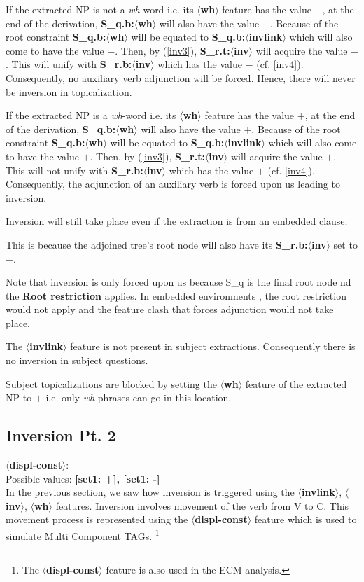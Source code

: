 If the extracted NP is not a {\em wh}-word i.e. its {\bf $\langle$wh$\rangle$}
feature has the value $-$, at the end of the derivation, 
{\bf S_{q}.b:$\langle$wh$\rangle$} will also have the value $-$. Because of
the root constraint {\bf S_{q}.b:$\langle$wh$\rangle$} will be equated 
to {\bf S_{q}.b:$\langle$invlink$\rangle$} which will also come to have 
the value $-$. Then, by (\ref{inv3}), {\bf S_{r}.t:$\langle$inv$\rangle$} 
will acquire the value $-$. This will unify with {\bf S_{r}.b:$\langle$inv$\rangle$}
which has the value $-$ (cf. \ref{inv4}). Consequently, no auxiliary verb
adjunction will be forced. Hence, there will never be inversion in topicalization.

If the extracted NP is a {\em wh}-word i.e. its {\bf $\langle$wh$\rangle$} 
feature has the value $+$, at the end of the derivation, 
{\bf S_{q}.b:$\langle$wh$\rangle$} will also have the value $+$. Because of
the root constraint {\bf S_{q}.b:$\langle$wh$\rangle$} will be equated 
to {\bf S_{q}.b:$\langle$invlink$\rangle$} which will also come to have
the value $+$. Then, by (\ref{inv3}), {\bf S_{r}.t:$\langle$inv$\rangle$} 
will acquire the value $+$. This will not unify with {\bf S_{r}.b:$\langle$inv$\rangle$}
which has the value $+$ (cf. \ref{inv4}). Consequently, the adjunction
of an auxiliary verb is forced upon us leading to inversion.

Inversion will still take place even if the extraction is from an embedded
clause.


This is because the adjoined tree's root node will also have its 
{\bf S_{r}.b:$\langle$inv$\rangle$} set to $-$. 


Note that inversion is only forced upon us because S_{q} is the final root node
nd the {\bf Root restriction} applies. In embedded environments , the 
root restriction would not apply and the feature clash that forces adjunction
would not take place. 

The {\bf $\langle$invlink$\rangle$} feature is not present in subject extractions.
Consequently there is no inversion in subject questions.

Subject topicalizations are blocked by setting the 
{\bf $\langle$wh$\rangle$} feature of the extracted NP to $+$ i.e. only
{\em wh}-phrases can go in this location. 

\subsection{Inversion Pt. 2}
{\bf $\langle$displ-const$\rangle$}:\\
Possible values: {\bf [set1: +], [set1: -]}\\
In the previous section, we saw how inversion is triggered using the
{\bf $\langle$invlink$\rangle$}, {\bf $\langle$inv$\rangle$},
{\bf $\langle$wh$\rangle$} features. Inversion involves movement
of the verb from V to C. This movement process is represented
using the {\bf $\langle$displ-const$\rangle$} feature which is
used to simulate Multi Component TAGs. 
\footnote{The {\bf $\langle$displ-const$\rangle$} feature is also used 
in the ECM analysis.}

